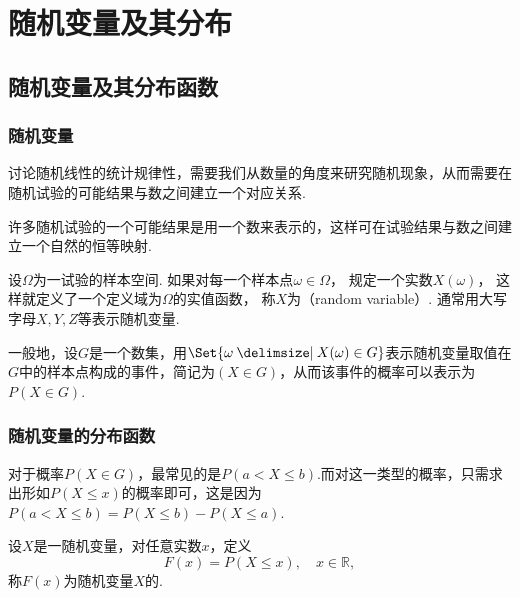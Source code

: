 \chapter{随机变量及其分布}
\section{随机变量及其分布函数}
\subsection{随机变量}
讨论随机线性的统计规律性，需要我们从数量的角度来研究随机现象，从而需要在随机试验的可能结果与数之间建立一个对应关系.

许多随机试验的一个可能结果是用一个数来表示的，这样可在试验结果与数之间建立一个自然的恒等映射.

\begin{definition}
设\(\Omega\)为一试验的样本空间.
如果对每一个样本点\(\omega \in \Omega\)，%
规定一个实数\(X(\omega)\)，%
这样就定义了一个定义域为\(\Omega\)的实值函数，%
称\(X\)为（random variable）.
通常用大写字母\(X,Y,Z\)等表示随机变量.

一般地，设\(G\)是一个数集，用\(\Set{\omega \given X(\omega) \in G}\)表示随机变量取值在\(G\)中的样本点构成的事件，简记为\((X \in G)\)，从而该事件的概率可以表示为\(P(X \in G)\).
\end{definition}

\subsection{随机变量的分布函数}
对于概率\(P(X \in G)\)，最常见的是\(P(a < X \leqslant b)\).而对这一类型的概率，只需求出形如\(P(X \leqslant x)\)的概率即可，这是因为\(P(a < X \leqslant b) = P(X \leqslant b) - P(X \leqslant a)\).

\begin{definition}
设\(X\)是一随机变量，对任意实数\(x\)，定义\[
F(x) = P(X \leqslant x), \quad x \in \mathbb{R},
\]称\(F(x)\)为随机变量\(X\)的.
\end{definition}

